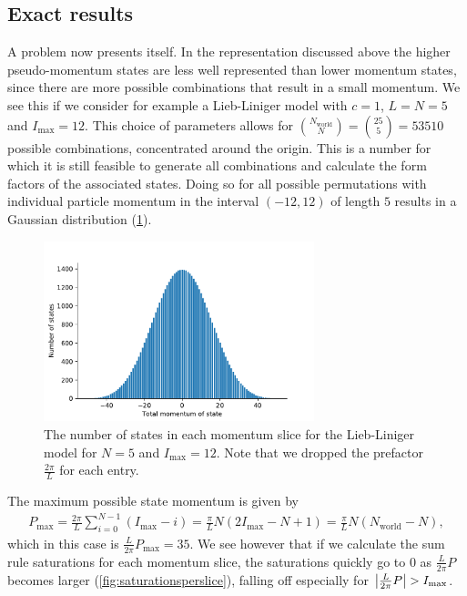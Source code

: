 \documentclass[11pt, a4paper]{report} %
\begin{document}
\subsection{Exact results}\label{sec:exact}

A problem now presents itself.
In the representation discussed above the higher pseudo-momentum states are less well represented than lower momentum states, since there are more possible combinations that result in a small momentum.
We see this if we consider for example a Lieb-Liniger model with \(c=1\), \(L=N=5\) and \(I_{\max} =12\).
This choice of parameters allows for \(\binom{N_{\mathrm{world}}}{N}=\binom{25}{5}=53510\) possible combinations, concentrated around the origin.
This is a number for which it is still feasible to generate all combinations and calculate the form factors of the associated states.
Doing so for all possible permutations with individual particle momentum in the interval \((-12, 12)\) of length \(5\) results in a Gaussian distribution (\cref{fig:no_of_states}).
\begin{figure}[tb]
  \centering
  \includegraphics[width=0.7\textwidth]{no_of_states}
  \caption{The number of states in each momentum slice for the Lieb-Liniger model for \(N=5\) and \(I_{\max}=12\). Note that we dropped the prefactor \(\frac{2\pi}{L}\) for each entry.}
  \label{fig:no_of_states}
\end{figure}
The maximum possible state momentum is given by
\begin{align}
  \label{eq:50}
  P_{\max} = \frac{2\pi}{L}\sum_{i=0}^{N-1}(I_{\max}-i) = \frac{\pi}{L}N (2 I_{\max} -N +1) = \frac{\pi}{L}N (N_{\mathrm{world}} -N),
\end{align}
which in this case is \(\frac{L}{2\pi}P_{\max} = 35\).
We see however that if we calculate the sum rule saturations for each momentum slice, the saturations quickly go to 0 as \(\frac{L}{2\pi}P\) becomes larger (\cref{fig:saturationsperslice}), falling off especially for \(\abs{\frac{L}{2\pi}P}>I_{\max}\).
\end{document}
